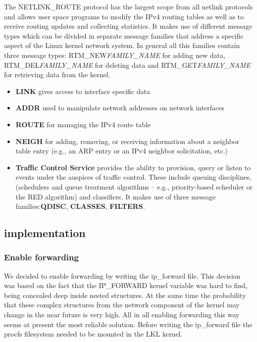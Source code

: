 {{The NETLINK_ROUTE protocol has the largest scope from all netlink protocols and allows user space programs 
to modify the IPv4 routing tables as well as to receive routing updates and collecting statistics. It makes use of 
different message types which can be divided in separate message families that address a specific aspect of the 
Linux kernel network system. In general all this families contain three message types: RTM_NEW\textit{FAMILY_NAME} 
for adding new data, RTM_DEL\textit{FAMILY_NAME} for deleting data and RTM_GET\textit{FAMILY_NAME} for retrieving data from the kernel.
\begin{itemize}
\item{\bf LINK} gives access to interface specific data
\item{\bf ADDR} used to manipulate network addresses on network interfaces
\item{\bf ROUTE} for managing the IPv4 route table
\item{\bf NEIGH} for adding, removing, or receiving information about a neighbor table entry (e.g., an ARP entry or an IPv4 neighbor solicitation, etc.)
\item \textbf{Traffic Control Service} provides the ability to provision, query or listen to
   events under the auspices of traffic control.  These include queuing
   disciplines, (schedulers and queue treatment algorithms -- e.g.,
   priority-based scheduler or the RED algorithm) and classifiers. It makes use of three message families:\textbf{QDISC}, \textbf{CLASSES}, \textbf{\bf FILTERS}.
\end{itemize} 

\subsection{\project implementation}
\label{sub-sec:router-lklnet}
\subsubsection{Enable forwarding}
We decided to enable forwarding by writing the ip_forward file. This decision was based on the fact that the 
IP_FORWARD kernel variable was hard to find, being concealed deep inside nested structures. At the same time 
the probability that these complex structures from the network component of the kernel may change in the near 
future is very high. All in all enabling forwarding this way seems at present the most reliable solution.
Before writing the ip_forward file the procfs filesystem needed to be mounted in the LKL kernel. 

}}
